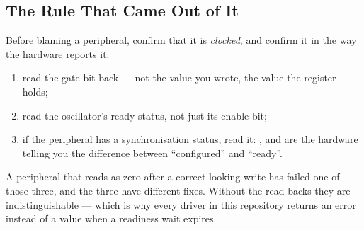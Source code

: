 \subsection{The Rule That Came Out of It}

Before blaming a peripheral, confirm that it is \emph{clocked}, and confirm it in the way the
hardware reports it:

\begin{enumerate}
    \item read the gate bit back — not the value you wrote, the value the register holds;
    \item read the oscillator's ready status, not just its enable bit;
    \item if the peripheral has a synchronisation status, read it: ,
           and  are the hardware telling you the
          difference between ``configured'' and ``ready''.
\end{enumerate}

A peripheral that reads as zero after a correct-looking write has failed one of those three, and the
three have different fixes. Without the read-backs they are indistinguishable — which is why every
driver in this repository returns an error instead of a value when a readiness wait expires.

